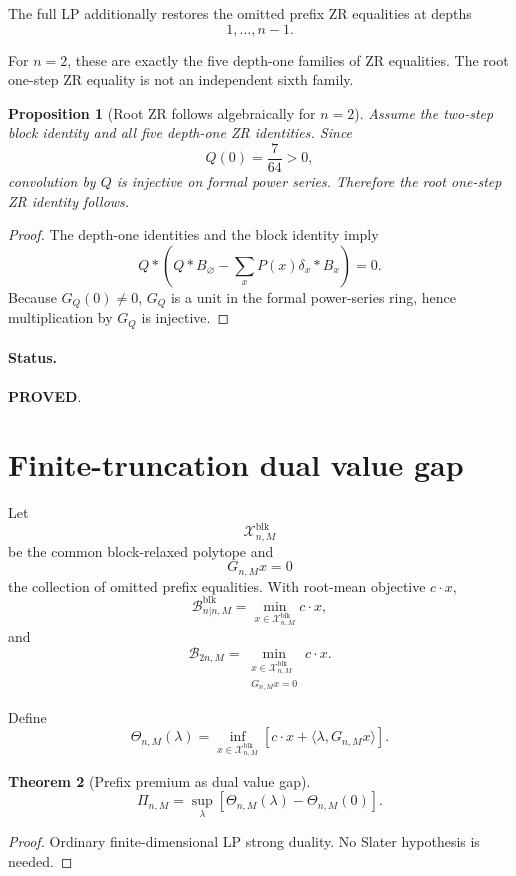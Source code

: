 \documentclass[11pt,a4paper]{article}
\newcommand{\Bcal}{\mathcal B}
\newcommand{\Xcal}{\mathcal X}
\newcommand{\blk}{\mathrm{blk}}
\newcommand{\PROVED}{\textcolor{green!45!black}{\textbf{PROVED}}}
\newtheorem{theorem}{Theorem}
\newtheorem{proposition}[theorem]{Proposition}
\begin{document}
The full LP additionally restores the omitted prefix ZR equalities at depths
\[
1,\dots,n-1.
\]

For \(n=2\), these are exactly the five depth-one families of ZR equalities.
The root one-step ZR equality is not an independent sixth family.

\begin{proposition}[Root ZR follows algebraically for \(n=2\)]
Assume the two-step block identity and all five depth-one ZR identities.
Since
\[
Q(0)=\frac7{64}>0,
\]
convolution by \(Q\) is injective on formal power series.
Therefore the root one-step ZR identity follows.
\end{proposition}

\begin{proof}
The depth-one identities and the block identity imply
\[
Q*
\left(
Q*B_\varnothing
-
\sum_xP(x)\delta_x*B_x
\right)
=0.
\]
Because \(G_Q(0)\neq0\), \(G_Q\) is a unit in the formal power-series ring,
hence multiplication by \(G_Q\) is injective.
\end{proof}

\paragraph{Status.}
\PROVED.

\section{Finite-truncation dual value gap}

Let
\[
\Xcal^{\blk}_{n,M}
\]
be the common block-relaxed polytope and
\[
G_{n,M}x=0
\]
the collection of omitted prefix equalities.
With root-mean objective \(c\cdot x\),
\[
\Bcal^{\blk}_{n|n,M}
=
\min_{x\in\Xcal^{\blk}_{n,M}}c\cdot x,
\]
and
\[
\Bcal_{2n,M}
=
\min_{\substack{x\in\Xcal^{\blk}_{n,M}\\G_{n,M}x=0}}c\cdot x.
\]

Define
\[
\Theta_{n,M}(\lambda)
=
\inf_{x\in\Xcal^{\blk}_{n,M}}
\left[
c\cdot x+\langle\lambda,G_{n,M}x\rangle
\right].
\]

\begin{theorem}[Prefix premium as dual value gap]
\[
\boxed{
\Pi_{n,M}
=
\sup_\lambda
\left[
\Theta_{n,M}(\lambda)-\Theta_{n,M}(0)
\right].
}
\tag{13}
\]
\end{theorem}

\begin{proof}
Ordinary finite-dimensional LP strong duality.
No Slater hypothesis is needed.
\end{proof}
\end{document}

